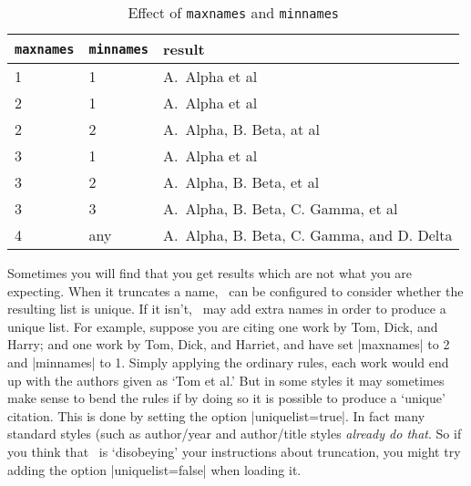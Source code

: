 \begin{table}
\begin{tabularx}{\textwidth}{llX}
\toprule
\texttt{maxnames} & \texttt{minnames} & \textsf{result} \\
\midrule
1                 &  1                & A.\ Alpha et al \\
2                 &  1                & A.\ Alpha et al \\
2                 &  2                & A.\ Alpha, B. Beta, at al \\
3                 &  1                & A.\ Alpha et al \\
3                 &  2                & A.\ Alpha, B. Beta, et al \\
3                 &  3                & A.\ Alpha, B. Beta, C. Gamma, et al \\
4                 &  any              & A.\ Alpha, B. Beta, C. Gamma, and D. Delta \\
\bottomrule
\end{tabularx}
\caption{Effect of \texttt{maxnames} and \texttt{minnames}\label{maxnames}}
\end{table}

Sometimes you will find that you get results which are not what you
are expecting. When it truncates a name, \biblatex\ can be configured
to consider whether the resulting list is unique. If it isn't,
\biblatex\ may add extra names in order to produce a unique list. For
example, suppose you are citing one work by Tom, Dick, and Harry; and
one work by Tom, Dick, and Harriet, and have set |maxnames| to 2 and
|minnames| to 1. Simply applying the ordinary rules, each work would
end up with the authors given as `Tom et al.' But in some styles it
may sometimes make sense to bend the rules if by doing so it is
possible to produce a `unique' citation. This is done by setting the
option |uniquelist=true|. In fact many standard styles
(such as author/year and author/title styles \emph{already do
  that}. So if you think that \biblatex\ is `disobeying' your
instructions about truncation, you might try adding the option
|uniquelist=false| when loading it.

